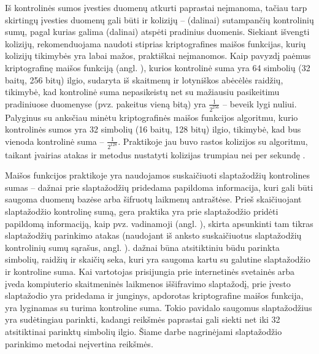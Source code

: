 \documentclass{VUMIFInfBakalaurinis}
\begin{document}
Iš kontrolinės sumos įvesties duomenų atkurti paprastai neįmanoma, tačiau tarp 
skirtingų įvesties duomenų gali būti ir kolizijų -- (dalinai) sutampančių 
kontrolinių sumų, pagal kurias galima (dalinai) atspėti pradinius duomenis. 
Siekiant išvengti kolizijų, rekomenduojama naudoti stiprias kriptografines 
maišos funkcijas, kurių kolizijų tikimybės yra labai mažos, praktiškai 
neįmanomos. Kaip pavyzdį paėmus  kriptografinę maišos 
funkciją (angl. ), kurios kontrolinė 
suma yra 64 simbolių (32 baitų, 256 bitų) ilgio, sudaryta iš skaitmenų ir 
lotyniškos abėcėlės raidžių, tikimybė, kad kontrolinė suma nepasikeistų net su 
mažiausiu pasikeitimu pradiniuose duomenyse (pvz. pakeitus vieną bitą) yra 
$\frac{1}{2^{256}}$ -- beveik lygi nuliui. Palyginus su anksčiau minėtu 
 kriptografinės maišos funkcijos algoritmu, kurio kontrolinės 
sumos yra 32 simbolių (16 baitų, 128 bitų) ilgio, tikimybė, kad bus vienoda 
kontrolinė suma -- $\frac{1}{2^{128}}$. Praktikoje jau buvo rastos kolizijos su 
 algoritmu, taikant įvairias atakas ir metodus nustatyti 
kolizijas trumpiau nei per sekundę \cite{BreakMD5,MD5Attacks}.

Maišos funkcijos praktikoje yra naudojamos suskaičiuoti slaptažodžių kontrolines 
sumas -- dažnai prie slaptažodžių pridedama papildoma informacija, kuri gali 
būti saugoma duomenų bazėse arba šifruotų laikmenų antraštėse. Prieš 
skaičiuojant slaptažodžio kontrolinę sumą, gera praktika yra prie slaptažodžio 
pridėti papildomą informaciją, kaip pvz. vadinamoji  (angl. 
), skirta apsunkinti tam tikras slaptažodžių parinkimo atakas 
(naudojant iš anksto suskaičiuotus slaptažodžių kontrolinių sumų sąrašus, angl. 
).  dažnai būna atsitiktiniu būdu
parinkta simbolių, raidžių ir skaičių seka, kuri yra saugoma kartu su galutine 
slaptažodžio ir  kontroline suma. Kai vartotojas prisijungia 
prie internetinės svetainės arba įveda kompiuterio skaitmeninės laikmenos 
iššifravimo slaptažodį, prie įvesto slaptažodio yra pridedama  
ir junginys, apdorotas kriptografine maišos funkcija, yra lyginamas su turima 
kontroline suma. Tokio pavidalo saugomus slaptažodžius yra sudėtingiau parinkti, 
kadangi  reikšmės paprastai gali siekti net iki 32 
atsitiktinai parinktų simbolių ilgio. Šiame darbe nagrinėjami slaptažodžio 
parinkimo metodai neįvertina  reikšmės.
\end{document}
